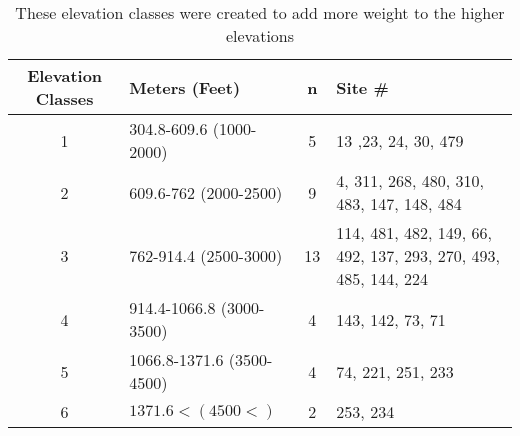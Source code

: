 \begin{table}[htbp]
\caption{These elevation classes were created to add more weight to the higher elevations}
\begin{tabular}{clcp{5cm}}
\toprule
Elevation Classes & Meters (Feet)                              & n & Site \# \\ 
\midrule
1                        & 304.8-609.6 (1000-2000)           & 5   & 13 ,23, 24, 30, 479 \\ 
2                        & 609.6-762 (2000-2500)              & 9   & 4, 311, 268, 480, 310, 483, 147, 148, 484 \\ 
3                        & 762-914.4 (2500-3000)              & 13 & 114, 481, 482, 149, 66, 492, 137, 293, 270, 493, 485, 144, 224 \\ 
4                        & 914.4-1066.8 (3000-3500)         & 4   & 143, 142, 73, 71 \\ 
5                        & 1066.8-1371.6 (3500-4500)       & 4   & 74, 221, 251, 233 \\ 
6                        & $1371.6< (4500<)$                    & 2   & 253, 234 \\ 
\bottomrule
\end{tabular}
\label{tab:ElevationBands}
\end{table}